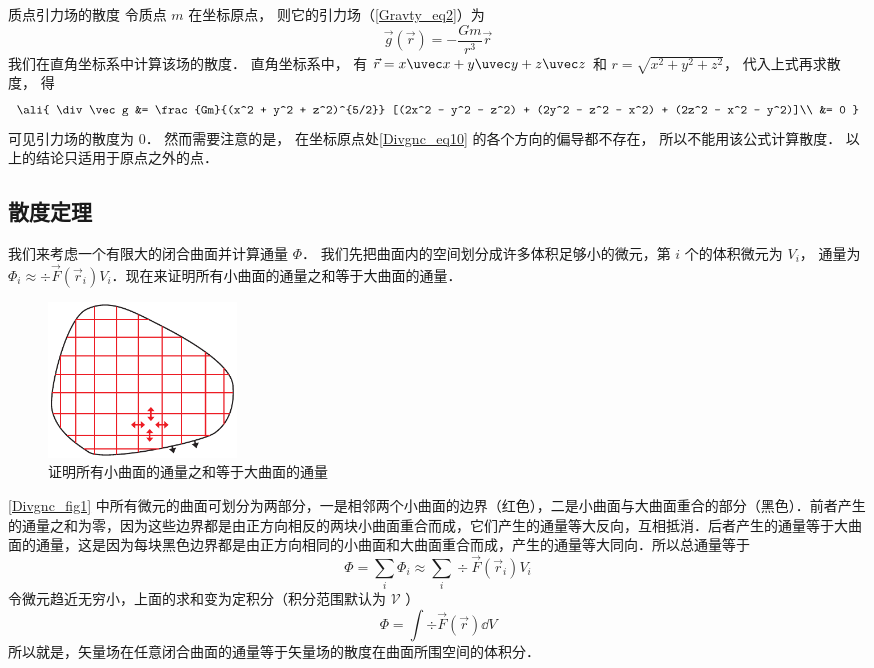 \begin{exam}{质点引力场的散度}
令质点 $m$ 在坐标原点， 则它的引力场（\autoref{Gravty_eq2}）为
\begin{equation}\label{Divgnc_eq10}
\vec g(\vec r) = -\frac{Gm}{r^3}\vec r
\end{equation}
我们在直角坐标系中计算该场的散度． 直角坐标系中， 有 $\vec r = x\uvec x + y\uvec y + z\uvec z$ 和 $r = \sqrt{x^2 + y^2 + z^2}$， 代入上式再求散度， 得
\begin{equation}\ali{
\div \vec g &= \frac{Gm}{(x^2 + y^2 + z^2)^{5/2}} [(2x^2 - y^2 - z^2) + (2y^2 - z^2 - x^2) + (2z^2 - x^2 - y^2)]\\
&= 0
}\end{equation}
可见引力场的散度为 0． 然而需要注意的是， 在坐标原点处\autoref{Divgnc_eq10} 的各个方向的偏导都不存在， 所以不能用该公式计算散度． 以上的结论只适用于原点之外的点．
\end{exam}


\subsection{散度定理}

我们来考虑一个有限大的闭合曲面并计算通量 $\Phi$． 我们先把曲面内的空间划分成许多体积足够小的微元，第 $i$ 个的体积微元为 $V_i$， 通量为 $\Phi_i \approx \div \vec F(\vec r_i) V_i$．现在来证明所有小曲面的通量之和等于大曲面的通量．
\begin{figure}[ht]
\centering
\includegraphics[width=5cm]{./figures/Divgnc1.pdf}
\caption{证明所有小曲面的通量之和等于大曲面的通量} \label{Divgnc_fig1}
\end{figure}
\autoref{Divgnc_fig1} 中所有微元的曲面可划分为两部分，一是相邻两个小曲面的边界（红色），二是小曲面与大曲面重合的部分（黑色）．前者产生的通量之和为零，因为这些边界都是由正方向相反的两块小曲面重合而成，它们产生的通量等大反向，互相抵消．后者产生的通量等于大曲面的通量，这是因为每块黑色边界都是由正方向相同的小曲面和大曲面重合而成，产生的通量等大同向．所以总通量等于
\begin{equation}
\Phi  = \sum_i \Phi_i  \approx \sum_i \div \vec F (\vec r_i) V_i
\end{equation}
令微元趋近无穷小，上面的求和变为定积分（积分范围默认为 $\mathcal V$ ）
\begin{equation}\label{Divgnc_eq13}
\Phi  = \int \div \vec F(\vec r) \dd{V}
\end{equation}
所以就是，矢量场在任意闭合曲面的通量等于矢量场的散度在曲面所围空间的体积分．



